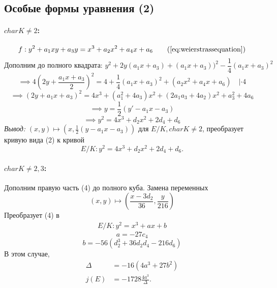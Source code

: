 \documentclass[12pt]{article}
\theoremstyle{definition}
\theoremstyle{definition}
\theoremstyle{definition}
\begin{document}
        \subsection{Особые формы уравнения (2)}
            \paragraph{$char K \neq 2$:}
            \begin{equation*}
                f: y^2+a_1xy + a_3y = x^3 + a_2x^2 + a_4x + a_6 \tag{\ref{eq:weierstrassequation}}
            \end{equation*}
            \[
            \text{Дополним до полного квадрата: } y^2 + 2y(a_1x+a_3)+(a_1x+a_3))^2- \frac{1}{4}(a_1x+a_3)^2
            \]
            \[
            \implies 4(2y + \frac{a_1x+a_3}{2})^2 = 4 + \frac{1}{4}(a_1x+a_3)^2 + (a_2x^2 + a_4x + a_6) \quad| \cdot 4
            \]
            \[
            \implies (2y + a_1x+a_3)^2 = 4x^3 + (a_1^2 + 4a_3)x^2 + (2a_1a_3 + 4a_2)x^2 + a_3^2 + 4a_6
            \]
            \[
            \implies y = \frac{1}{2}(y' - a_1x - a_3)
            \]
            \[
            \implies y^2 = 4x^3 + d_2x^2 + 2d_4 + d_6
            \]
            \textit{Вывод: } $(x, y)\mapsto(x, \frac{1}{2}(y-a_1x-a_3))$ для $E/K, char K \neq 2$, преобразует кривую вида (2) к кривой
            \begin{equation}
                E/K: y^2 = 4x^3 + d_2x^2 + 2d_4 + d_6.
            \end{equation}
            
            \paragraph{$char K \neq 2, 3$:} 
            Дополним правую часть (4) до полного куба. Замена переменных
            \[
            (x, y) \mapsto (\frac{x-3d_2}{36}, \frac{y}{216})
            \]
            Преобразует (4) в 
            \begin{align}
                E/K: y^2 = x^3 + ax + b
            \end{align}
            \[
                a = -27c_4
            \]
            \[
                b = -56(d_2^3 + 36d_2d_4 - 216d_6) 
            \]
            В этом случае, 
            \begin{align*}
                \Delta &= -16(4a^3 + 27b^2) \\ \nonumber
                j(E) &= -1728 \frac{4a^3}{\Delta}. \nonumber
            \end{align*}
                  
\end{document}
